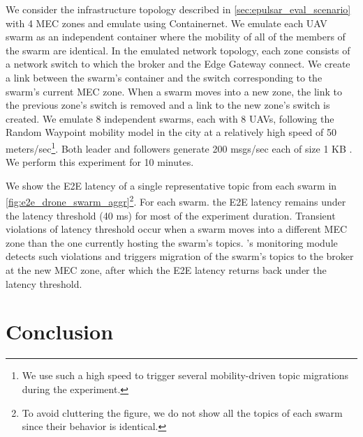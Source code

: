 We consider the infrastructure topology described in \cref{sec:epulsar_eval_scenario} with 4 MEC zones and emulate using Containernet. We emulate each UAV swarm as an independent container where the mobility of all of the members of the swarm are identical. In the emulated network topology, each zone consists of a network switch to which the broker and the Edge Gateway connect. We create a link between the swarm's container and the switch corresponding to the swarm's current MEC zone. When a swarm moves into a new zone, the link to the previous zone's switch is removed and a link to the new zone's switch is created. We emulate 8 independent swarms, each with 8 UAVs, following the Random Waypoint mobility model in the city at a relatively high speed of 50 meters/sec\footnote{We use such a high speed to trigger several mobility-driven topic migrations during the experiment.}. Both leader and followers generate 200 msgs/sec each of size 1 KB \cite{yang2018telecom}. We perform this experiment for 10 minutes.
\par We show the E2E latency of a single representative topic from each swarm in \cref{fig:e2e_drone_swarm_aggr}\footnote{To avoid cluttering the figure, we do not show all the topics of each swarm since their behavior is identical.}.
For each swarm. the E2E latency remains under the latency threshold  (40 ms) for most of the experiment duration. Transient violations of latency threshold occur when a swarm moves into a different MEC zone than the one currently hosting the swarm's topics. \epulsar{}'s monitoring module detects such violations and triggers migration of the swarm's topics to the broker at the new MEC zone, after which the E2E latency returns back under the latency threshold.

\section{Conclusion}
\label{sec:epulsar_conclusion}